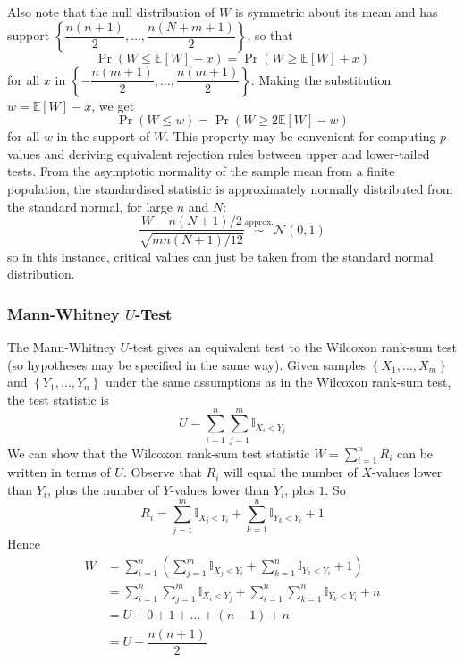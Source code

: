 \documentclass[11pt]{report} %
\begin{document}
Also note that the null distribution of $W$ is symmetric about its mean and has support $\left\{\dfrac{n\left(n + 1\right)}{2}, \dots, \dfrac{n\left(N + m + 1\right)}{2}\right\}$, so that 
\begin{equation}
\operatorname{Pr}\left(W \leq \mathbb{E}\left[W\right] - x\right) = \operatorname{Pr}\left(W \geq \mathbb{E}\left[W\right] + x\right)
\end{equation}
for all $x$ in $\left\{-\dfrac{n\left(m + 1\right)}{2}, \dots, \dfrac{n\left(m + 1\right)}{2}\right\}$. Making the substitution $w = \mathbb{E}\left[W\right] - x$, we get
\begin{equation}
\operatorname{Pr}\left(W \leq w\right) = \operatorname{Pr}\left(W \geq 2\mathbb{E}\left[W\right] - w\right)
\end{equation}
for all $w$ in the support of $W$. This property may be convenient for computing $p$-values and deriving equivalent rejection rules between upper and lower-tailed tests. From the asymptotic normality of the sample mean from a finite population, the standardised statistic is approximately normally distributed from the standard normal, for large $n$ and $N$:
\begin{equation}
\dfrac{W - n\left(N + 1\right)/2}{\sqrt{mn\left(N + 1\right)/12}} \overset{\mathrm{approx.}}{\sim} \mathcal{N}\left(0, 1\right)
\end{equation}
so in this instance, critical values can just be taken from the standard normal distribution.

\subsubsection{Mann-Whitney $U$-Test}

The Mann-Whitney $U$-test gives an equivalent test to the Wilcoxon rank-sum test (so hypotheses may be specified in the same way). Given samples $\left\{X_{1}, \dots, X_{m}\right\}$ and $\left\{Y_{1}, \dots, Y_{n}\right\}$ under the same assumptions as in the Wilcoxon rank-sum test, the test statistic is
\begin{equation}
U = \sum_{i = 1}^{n}\sum_{j = 1}^{m}\mathbb{I}_{X_{i} < Y_{j}}
\end{equation}
We can show that the Wilcoxon rank-sum test statistic $W = \sum_{i = 1}^{n}R_{i}$ can be written in terms of $U$. Observe that $R_{i}$ will equal the number of $X$-values lower than $Y_{i}$, plus the number of $Y$-values lower than $Y_{i}$, plus $1$. So
\begin{equation}
R_{i} = \sum_{j = 1}^{m}\mathbb{I}_{X_{j} < Y_{i}} + \sum_{k = 1}^{n}\mathbb{I}_{Y_{k} < Y_{i}} + 1
\end{equation}
Hence
\begin{align}
W &= \sum_{i = 1}^{n}\left(\sum_{j = 1}^{m}\mathbb{I}_{X_{j} < Y_{i}} + \sum_{k = 1}^{n}\mathbb{I}_{Y_{k} < Y_{i}} + 1\right) \\
&= \sum_{i = 1}^{n}\sum_{j = 1}^{m}\mathbb{I}_{X_{i} < Y_{j}} + \sum_{i = 1}^{n}\sum_{k = 1}^{n}\mathbb{I}_{Y_{k} < Y_{i}} + n \\
&= U + 0 + 1 + \dots + \left(n - 1\right) + n \\
&= U + \dfrac{n\left(n + 1\right)}{2}
\end{align}
\end{document}
